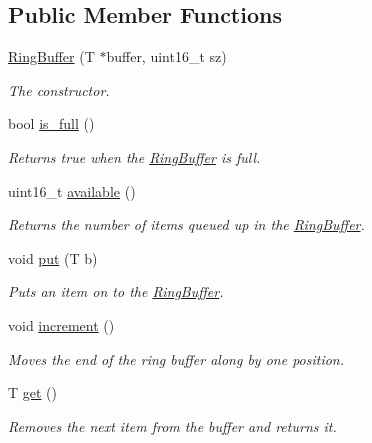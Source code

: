 \subsection*{Public Member Functions}
\begin{DoxyCompactItemize}
\item 
\hyperlink{classetk_1_1_ring_buffer_a2a6d3471b49baba47dbf58e47a6ba810}{Ring\-Buffer} (T $\ast$buffer, uint16\-\_\-t sz)
\begin{DoxyCompactList}\small\item\em The constructor. \end{DoxyCompactList}\item 
bool \hyperlink{classetk_1_1_ring_buffer_a978d9d2868965d77ecc1270d0b54707d}{is\-\_\-full} ()
\begin{DoxyCompactList}\small\item\em Returns true when the \hyperlink{classetk_1_1_ring_buffer}{Ring\-Buffer} is full. \end{DoxyCompactList}\item 
uint16\-\_\-t \hyperlink{classetk_1_1_ring_buffer_a67b70ec4c7698adcf060810c8d7756d2}{available} ()
\begin{DoxyCompactList}\small\item\em Returns the number of items queued up in the \hyperlink{classetk_1_1_ring_buffer}{Ring\-Buffer}. \end{DoxyCompactList}\item 
void \hyperlink{classetk_1_1_ring_buffer_ac17418eb9abba39351152b7d70a426ae}{put} (T b)
\begin{DoxyCompactList}\small\item\em Puts an item on to the \hyperlink{classetk_1_1_ring_buffer}{Ring\-Buffer}. \end{DoxyCompactList}\item 
void \hyperlink{classetk_1_1_ring_buffer_a251380d6c89541f0be046e6358c2307b}{increment} ()
\begin{DoxyCompactList}\small\item\em Moves the end of the ring buffer along by one position. \end{DoxyCompactList}\item 
T \hyperlink{classetk_1_1_ring_buffer_ac1327e40f6f3914156154e669076f4b8}{get} ()
\begin{DoxyCompactList}\small\item\em Removes the next item from the buffer and returns it. \end{DoxyCompactList}\item 

\end{DoxyCompactItemize}
